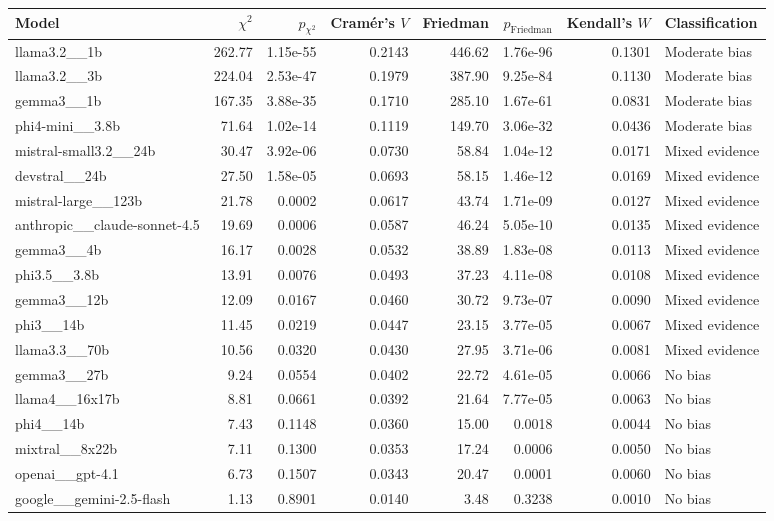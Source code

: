 \begin{tabular}{l r r r r r r l}
\toprule
\textbf{Model} & \textbf{$\chi^2$} & \textbf{$p_{\chi^2}$} & \textbf{Cram\'er's $V$} & \textbf{Friedman} & \textbf{$p_{\text{Friedman}}$} & \textbf{Kendall's $W$} & \textbf{Classification} \\
\midrule
llama3.2\_\_1b & 262.77 & 1.15e-55 & 0.2143 & 446.62 & 1.76e-96 & 0.1301 & Moderate bias \\
llama3.2\_\_3b & 224.04 & 2.53e-47 & 0.1979 & 387.90 & 9.25e-84 & 0.1130 & Moderate bias \\
gemma3\_\_1b & 167.35 & 3.88e-35 & 0.1710 & 285.10 & 1.67e-61 & 0.0831 & Moderate bias \\
phi4-mini\_\_3.8b & 71.64 & 1.02e-14 & 0.1119 & 149.70 & 3.06e-32 & 0.0436 & Moderate bias \\
mistral-small3.2\_\_24b & 30.47 & 3.92e-06 & 0.0730 & 58.84 & 1.04e-12 & 0.0171 & Mixed evidence \\
devstral\_\_24b & 27.50 & 1.58e-05 & 0.0693 & 58.15 & 1.46e-12 & 0.0169 & Mixed evidence \\
mistral-large\_\_123b & 21.78 & 0.0002 & 0.0617 & 43.74 & 1.71e-09 & 0.0127 & Mixed evidence \\
anthropic\_\_claude-sonnet-4.5 & 19.69 & 0.0006 & 0.0587 & 46.24 & 5.05e-10 & 0.0135 & Mixed evidence \\
gemma3\_\_4b & 16.17 & 0.0028 & 0.0532 & 38.89 & 1.83e-08 & 0.0113 & Mixed evidence \\
phi3.5\_\_3.8b & 13.91 & 0.0076 & 0.0493 & 37.23 & 4.11e-08 & 0.0108 & Mixed evidence \\
gemma3\_\_12b & 12.09 & 0.0167 & 0.0460 & 30.72 & 9.73e-07 & 0.0090 & Mixed evidence \\
phi3\_\_14b & 11.45 & 0.0219 & 0.0447 & 23.15 & 3.77e-05 & 0.0067 & Mixed evidence \\
llama3.3\_\_70b & 10.56 & 0.0320 & 0.0430 & 27.95 & 3.71e-06 & 0.0081 & Mixed evidence \\
gemma3\_\_27b & 9.24 & 0.0554 & 0.0402 & 22.72 & 4.61e-05 & 0.0066 & No bias \\
llama4\_\_16x17b & 8.81 & 0.0661 & 0.0392 & 21.64 & 7.77e-05 & 0.0063 & No bias \\
phi4\_\_14b & 7.43 & 0.1148 & 0.0360 & 15.00 & 0.0018 & 0.0044 & No bias \\
mixtral\_\_8x22b & 7.11 & 0.1300 & 0.0353 & 17.24 & 0.0006 & 0.0050 & No bias \\
openai\_\_gpt-4.1 & 6.73 & 0.1507 & 0.0343 & 20.47 & 0.0001 & 0.0060 & No bias \\
google\_\_gemini-2.5-flash & 1.13 & 0.8901 & 0.0140 & 3.48 & 0.3238 & 0.0010 & No bias \\
\bottomrule
\end{tabular}